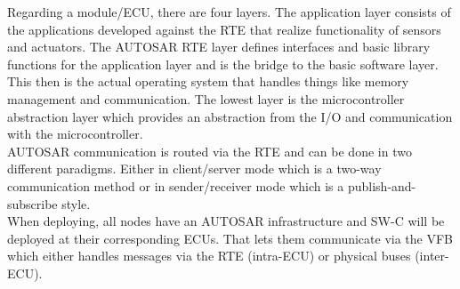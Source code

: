 Regarding a module/ECU, there are four layers.
The application layer consists of the applications developed against the RTE that realize functionality of sensors and actuators.
The AUTOSAR RTE layer defines interfaces and basic library functions for the application layer and is the bridge to the basic software layer.
This then is the actual operating system that handles things like memory management and communication.
The lowest layer is the microcontroller abstraction layer which provides an abstraction from the I/O and communication with the microcontroller.\\

AUTOSAR communication is routed via the RTE and can be done in two different paradigms.
Either in client/server mode which is a two-way communication method or in sender/receiver mode which is a publish-and-subscribe style.\\

When deploying, all nodes have an AUTOSAR infrastructure and SW-C will be deployed at their corresponding ECUs.
That lets them communicate via the VFB which either handles messages via the RTE (intra-ECU) or physical buses (inter-ECU).

